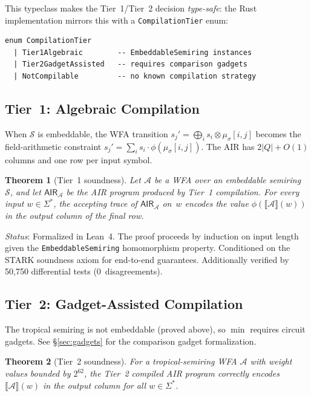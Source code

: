 \documentclass[11pt]{article}
\newtheorem{theorem}{Theorem}[section]
\newcommand{\semiring}[1]{\mathcal{#1}}
\newcommand{\wfa}{\mathcal{A}}
\newcommand{\AIR}{\textsf{AIR}}
\begin{document}
This typeclass makes the Tier~1/Tier~2 decision \emph{type-safe}:
the Rust implementation mirrors this with a \texttt{CompilationTier}
enum:

\begin{lstlisting}[language=Lean4,caption={Rust CompilationTier (Lean-style pseudocode).}]
enum CompilationTier
  | Tier1Algebraic        -- EmbeddableSemiring instances
  | Tier2GadgetAssisted   -- requires comparison gadgets
  | NotCompilable         -- no known compilation strategy
\end{lstlisting}

\subsection{Tier~1: Algebraic Compilation}

When $\semiring{S}$ is embeddable, the WFA transition
$s_j' = \bigoplus_i s_i \otimes \mu_\sigma[i,j]$ becomes the
field-arithmetic constraint
$s_j' = \sum_i s_i \cdot \phi(\mu_\sigma[i,j])$.
The AIR has $2|Q|+O(1)$ columns and one row per input symbol.

\begin{theorem}[Tier~1 soundness]\label{thm:tier1}
Let $\wfa$ be a WFA over an embeddable semiring~$\semiring{S}$,
and let $\AIR_\wfa$ be the AIR program produced by Tier~1
compilation.
For every input $w\in\Sigma^*$, the accepting trace of
$\AIR_\wfa$ on~$w$ encodes the value
$\phi(\llbracket\wfa\rrbracket(w))$
in the output column of the final row.
\end{theorem}

\emph{Status}: Formalized in Lean~4.
The proof proceeds by induction on input length given the
\texttt{EmbeddableSemiring} homomorphism property.
Conditioned on the STARK soundness axiom for end-to-end guarantees.
Additionally verified by 50{,}750 differential tests (0~disagreements).

\subsection{Tier~2: Gadget-Assisted Compilation}

The tropical semiring is not embeddable (proved above), so $\min$
requires circuit gadgets.
See \S\ref{sec:gadgets} for the comparison gadget formalization.

\begin{theorem}[Tier~2 soundness]\label{thm:tier2}
For a tropical-semiring WFA $\wfa$ with weight values bounded by
$2^{62}$, the Tier~2 compiled AIR program correctly encodes
$\llbracket\wfa\rrbracket(w)$ in the output column for all
$w \in \Sigma^*$.
\end{theorem}
\end{document}
